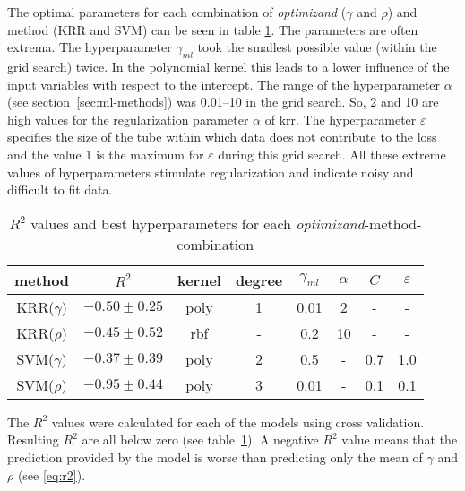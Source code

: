 The optimal parameters for each combination of 
\textit{optimizand} ($\gamma$ and $\rho$) and method (KRR and SVM) 
can be seen in table \ref{tab:grid-search}. 
The parameters are often extrema.
The hyperparameter $\gamma_{ml}$ took the smallest possible value (within the grid search) twice. 
In the polynomial kernel this leads to a lower influence of the input variables with respect to the intercept. 
The range of the hyperparameter $\alpha$ (see section~\ref{sec:ml-methods}) was 0.01--10 in the grid search. 
So, 2 and 10 are high values for the regularization parameter $\alpha$ of \gls{krr}.
The hyperparameter $\varepsilon$ specifies the size of the tube within which data does not contribute to the loss 
and the value 1 is the maximum for $\varepsilon$ during this grid search. 
All these extreme values of hyperparameters stimulate regularization and indicate noisy and difficult to fit data.
\begin{table}
    \center
    \begin{tabular}{cccccccc}
        \hline\hline
        method  &$R^2$   &kernel &degree &$\gamma_{ml}$   &$\alpha$    &$C$    &$\varepsilon$\\
        \hline
        KRR($\gamma$) & $-0.50 \pm 0.25$  &poly   &1  &0.01   &2 &-&-\\
        KRR($\rho  $) & $-0.45 \pm 0.52$  &rbf    &-   &0.2   &10&-&-\\
        SVM($\gamma$) & $-0.37 \pm 0.39$  &poly   &2  &0.5    &-&0.7  &1.0  \\
        SVM($\rho  $) & $-0.95 \pm 0.44$  &poly   &3  &0.01   &-&0.1  &0.1  \\
        \hline\hline
    \end{tabular}
    \caption{$R^2$ values and best hyperparameters for each \textit{optimizand}-method-combination}
    \label{tab:grid-search}
\end{table}
The $R^2$ values were calculated for each of the models using cross validation. 
Resulting $R^2$ are all below zero (see table~\ref{tab:grid-search}). 
A negative $R^2$ value means that the prediction provided by the model is worse than predicting only the mean of $\gamma$ and $\rho$ (see \ref{eq:r2}). 

